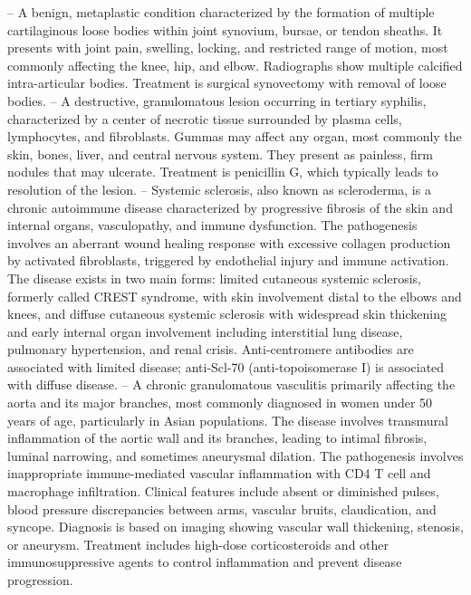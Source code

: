 -- A benign, metaplastic condition characterized by the formation of multiple cartilaginous loose bodies within joint synovium, bursae, or tendon sheaths. It presents with joint pain, swelling, locking, and restricted range of motion, most commonly affecting the knee, hip, and elbow. Radiographs show multiple calcified intra-articular bodies. Treatment is surgical synovectomy with removal of loose bodies.
-- A destructive, granulomatous lesion occurring in tertiary syphilis, characterized by a center of necrotic tissue surrounded by plasma cells, lymphocytes, and fibroblasts. Gummas may affect any organ, most commonly the skin, bones, liver, and central nervous system. They present as painless, firm nodules that may ulcerate. Treatment is penicillin G, which typically leads to resolution of the lesion.
-- Systemic sclerosis, also known as scleroderma, is a chronic autoimmune disease characterized by progressive fibrosis of the skin and internal organs, vasculopathy, and immune dysfunction. The pathogenesis involves an aberrant wound healing response with excessive collagen production by activated fibroblasts, triggered by endothelial injury and immune activation. The disease exists in two main forms: limited cutaneous systemic sclerosis, formerly called CREST syndrome, with skin involvement distal to the elbows and knees, and diffuse cutaneous systemic sclerosis with widespread skin thickening and early internal organ involvement including interstitial lung disease, pulmonary hypertension, and renal crisis. Anti-centromere antibodies are associated with limited disease; anti-Scl-70 (anti-topoisomerase I) is associated with diffuse disease.
-- A chronic granulomatous vasculitis primarily affecting the aorta and its major branches, most commonly diagnosed in women under 50 years of age, particularly in Asian populations. The disease involves transmural inflammation of the aortic wall and its branches, leading to intimal fibrosis, luminal narrowing, and sometimes aneurysmal dilation. The pathogenesis involves inappropriate immune-mediated vascular inflammation with CD4 T cell and macrophage infiltration. Clinical features include absent or diminished pulses, blood pressure discrepancies between arms, vascular bruits, claudication, and syncope. Diagnosis is based on imaging showing vascular wall thickening, stenosis, or aneurysm. Treatment includes high-dose corticosteroids and other immunosuppressive agents to control inflammation and prevent disease progression.
